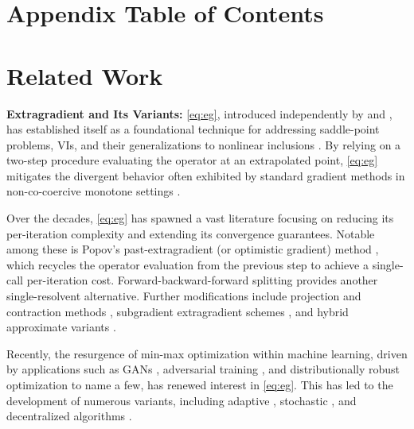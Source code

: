 \documentclass[letter,11pt]{article}
\begin{document}
\section*{Appendix Table of Contents}
\startcontents[appendix]
\newpage
\section{Related Work}\label{sec:prior}
\noindent\textbf{Extragradient and Its Variants:}
\eqref{eq:eg}, introduced independently by \cite{Korpelevic1976} and \cite{antipin1976}, has established itself as a foundational technique for addressing saddle-point problems, VIs, and their generalizations to nonlinear inclusions \cite{Bauschke2011,Facchinei2003}. By relying on a two-step procedure evaluating the operator at an extrapolated point, \eqref{eq:eg} mitigates the divergent behavior often exhibited by standard gradient methods in non-co-coercive monotone settings \cite{Facchinei2003,tseng1995linear}. 

Over the decades, \eqref{eq:eg} has spawned a vast literature focusing on reducing its per-iteration complexity and extending its convergence guarantees. Notable among these is Popov's past-extragradient (or optimistic gradient) method \cite{popov1980modification}, which recycles the operator evaluation from the previous step to achieve a single-call per-iteration cost. Forward-backward-forward splitting \cite{tseng2000modified} provides another single-resolvent alternative. Further modifications include projection and contraction methods \cite{he1997class,xiu2001convergence}, subgradient extragradient schemes \cite{censor2011subgradient,censor2012extensions}, and hybrid approximate variants \cite{solodov1999hybrid,solodov1999new}. 

Recently, the resurgence of min-max optimization within machine learning, driven by applications such as GANs \cite{goodfellow2014generative,arjovsky2017wasserstein}, adversarial training \cite{madry2018towards}, and distributionally robust optimization \cite{namkoong2016stochastic,levy2020large} to name a few, has renewed interest in \eqref{eq:eg}. This has led to the development of numerous variants, including adaptive \cite{antonakopoulos2020adaptive}, stochastic \cite{gorbunov2022stochastic,gidel2018variational,mishchenko2020revisiting,hsieh2019convergence}, and decentralized algorithms \cite{beznosikov2022decentralized,wei2021last}.
\end{document}
